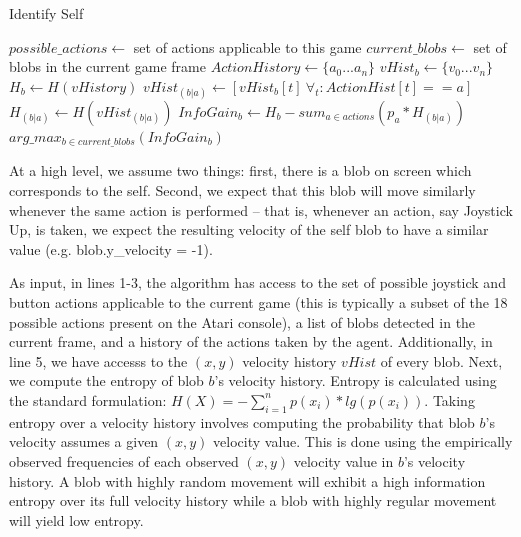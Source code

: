 \documentclass{acm_proc_article-sp}
\begin{document}
\begin{algorithm}
\caption{Identify Self}
\label{alg:idself}
\begin{algorithmic}[1]
  \STATE $possible\_actions \leftarrow $ set of actions applicable to this game
  \STATE $current\_blobs \leftarrow $ set of blobs in the current game frame
  \STATE $ActionHistory \leftarrow \{a_0...a_n\}$ %
  \STATE $vHist_b \leftarrow \{v_0...v_n\}$ %
  \STATE $H_b \leftarrow H(vHistory)$ 
  \STATE $vHist_{(b|a)} \leftarrow [vHist_b[t] ~\forall_t: ActionHist[t] == a]$ 
  \STATE $H_{(b|a)} \leftarrow H(vHist_{(b|a)})$ %
  \ENDFOR
  \STATE $InfoGain_b \leftarrow H_b - sum_{a \in actions}(p_a * H_{(b|a)})$ %
  \ENDFOR
  \RETURN $arg\_max_{b \in current\_blobs}(InfoGain_b)$ %
\end{algorithmic}
\end{algorithm}

At a high level, we assume two things: first, there is a blob on screen which corresponds to the self. Second, we expect that this blob will move similarly whenever the same action is performed -- that is, whenever an action, say Joystick Up, is taken, we expect the resulting velocity of the self blob to have a similar value (e.g. blob.y\_velocity = -1). 

As input, in lines 1-3, the algorithm has access to the set of possible joystick and button actions applicable to the current game (this is typically a subset of the 18 possible actions present on the Atari console), a list of blobs detected in the current frame, and a history of the actions taken by the agent. Additionally, in line 5, we have accesss to the $(x,y)$ velocity history $vHist$ of every blob. Next, we compute the entropy of blob $b$'s velocity history. Entropy is calculated using the standard formulation: $H(X) = -\sum_{i=1}^n{p(x_i)*lg(p(x_i))}$. Taking entropy over a velocity history involves computing the probability that blob $b$'s velocity assumes a given $(x,y)$ velocity value. This is done using the empirically observed frequencies of each observed $(x,y)$ velocity value in $b$'s velocity history. A blob with highly random movement will exhibit a high information entropy over its full velocity history while a blob with highly regular movement will yield low entropy.
\end{document}
